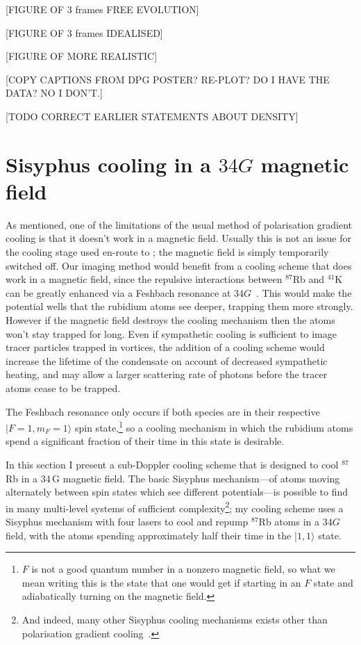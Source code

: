 [FIGURE OF 3 frames FREE EVOLUTION] \label{fig:velocimetry_dark}

[FIGURE OF 3 frames IDEALISED] \label{fig:velocimetry_idealised}

[FIGURE OF MORE REALISTIC] \label{fig:velocimetry_realistic}

[COPY CAPTIONS FROM DPG POSTER? RE-PLOT? DO I HAVE THE DATA? NO I DON'T.]

[TODO CORRECT EARLIER STATEMENTS ABOUT DENSITY]


\section{Sisyphus cooling in a $34\unit{G}$ magnetic field}\label{sec:laser_cooling_simulations}

As mentioned, one of the limitations of the usual method of polarisation gradient cooling is that it doesn't work in a magnetic field. Usually this is not an issue for the cooling stage used en-route to \bec; the magnetic field is simply temporarily switched off. Our imaging method would benefit from a cooling scheme that does work in a magnetic field, since the repulsive interactions between $^{87}$Rb and $^{41}$K can be greatly enhanced via a Feshbach resonance at $34 \unit{G}$~\cite{thalhammer_double_2008}. This would make the potential wells that the rubidium atoms see deeper, trapping them more strongly. However if the magnetic field destroys the cooling mechanism then the atoms won't stay trapped for long. Even if sympathetic cooling is sufficient to image tracer particles trapped in vortices, the addition of a cooling scheme would increase the lifetime of the condensate on account of decreased sympathetic heating, and may allow a larger scattering rate of photons before the tracer atoms cease to be trapped.

The Feshbach resonance only occurs if both species are in their respective \mbox{$|F=1,m_F=1\rangle$} spin state,\footnote{$F$ is not a good quantum number in a nonzero magnetic field, so what we mean writing this is the state that one would get if starting in an $F$ state and adiabatically turning on the magnetic field.} so a cooling mechanism in which the rubidium atoms spend a significant fraction of their time in this state is desirable.

In this section I present a sub-Doppler cooling scheme that is designed to cool $^{87}$Rb in a $34\,$G magnetic field. The basic Sisyphus mechanism---of atoms moving alternately between spin states which see different potentials---is possible to find in many multi-level systems of sufficient complexity\footnote{And indeed, many other Sisyphus cooling mechanisms exists other than polarisation gradient cooling~\cite[p 116]{metcalf_laser_1999}.}; my cooling scheme uses a Sisyphus mechanism with four lasers to cool and repump $^{87}$Rb atoms in a $34\unit{G}$ field, with the atoms spending approximately half their time in the \mbox{|$1,1\rangle$} state.

